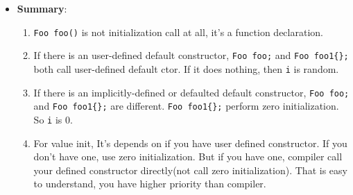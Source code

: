 \documentclass[a4paper,11pt,twoside]{book}
\begin{document}
\begin{itemize}
\item \textbf{Summary}:
\begin{enumerate}
	\item \texttt{Foo foo()} is not initialization call at all, it's a function declaration. 
	
	\item If there is an user-defined default constructor, \texttt{Foo foo;} and \texttt{Foo foo1\{\};} both call user-defined default ctor. If it does nothing, then \texttt{i} is random.
	
	\item If there is an implicitly-defined or defaulted default constructor, \texttt{Foo foo;} and \texttt{Foo foo1\{\};} are different. \texttt{Foo foo1\{\};} perform zero initialization. So \texttt{i} is 0. 
	
	\item For value init, It's depends on if you have user defined constructor. If you don't have one, use zero initialization. But if you have one, compiler call your defined constructor directly(not call zero initialization). That is easy to understand, you have higher priority than compiler. 
\end{enumerate}

\end{itemize}
\end{document}
